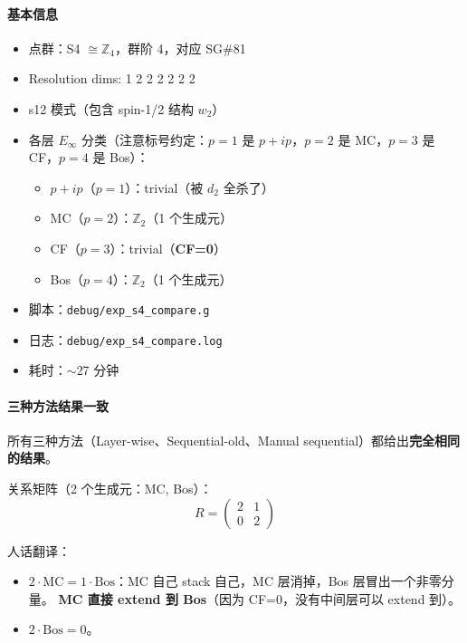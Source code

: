 \documentclass[a4paper,fontset=ubuntu,12pt]{ctexart}
\begin{document}
\paragraph{基本信息}
\begin{itemize}
\item 点群：S4 $\cong \mathbb{Z}_4$，群阶 4，对应 SG\#81
\item Resolution dims: 1 2 2 2 2 2 2
\item s12 模式（包含 spin-1/2 结构 $w_2$）
\item 各层 $E_\infty$ 分类（注意标号约定：$p=1$ 是 $p{+}ip$，$p=2$ 是 MC，$p=3$ 是 CF，$p=4$ 是 Bos）：
  \begin{itemize}
  \item $p{+}ip$（$p=1$）：trivial（被 $d_2$ 全杀了）
  \item MC（$p=2$）：$\mathbb{Z}_2$（1 个生成元）
  \item CF（$p=3$）：trivial（\textbf{CF=0}）
  \item Bos（$p=4$）：$\mathbb{Z}_2$（1 个生成元）
  \end{itemize}
\item 脚本：\texttt{debug/exp\_s4\_compare.g}
\item 日志：\texttt{debug/exp\_s4\_compare.log}
\item 耗时：$\sim$27 分钟
\end{itemize}

\paragraph{三种方法结果一致}

所有三种方法（Layer-wise、Sequential-old、Manual sequential）都给出\textbf{完全相同的结果}。

关系矩阵（2 个生成元：MC, Bos）：
\begin{equation}
R = \begin{pmatrix} 2 & 1 \\ 0 & 2 \end{pmatrix}
\label{eq:rmat-s4}
\end{equation}

人话翻译：
\begin{itemize}
\item $2\cdot\mathrm{MC} = 1\cdot\mathrm{Bos}$：MC 自己 stack 自己，MC 层消掉，Bos 层冒出一个非零分量。
  \textbf{MC 直接 extend 到 Bos}（因为 CF=0，没有中间层可以 extend 到）。
\item $2\cdot\mathrm{Bos} = 0$。
\end{itemize}
\end{document}

